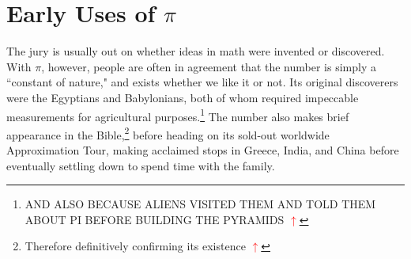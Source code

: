 \documentclass[11pt,titlepage]{article}
\begin{document}
\begin{comment}
\begin{figure}[h]
\centering
\texttt{[image: Jones]}
\caption{William Jones, AKA ``Poofy-White-Haired Donald Trump"}
\end{figure}

\hypertarget{Stuff}The symbol didn't gain widespread usage until it was adopted by Leonhard Euler, who used it in the famous \textit{Introductio in Analysin Infinitorum}\footnote{Latin for ``Math stuff" \hyperlink{Stuff}{\textbf{\textcolor{red}{$\uparrow$}}}} in 1748. From that point on $\pi$ was commonplace notation. 

\begin{figure}[h]
\centering
\texttt{[image: Euler]}
\caption{Leonhard Euler: The Most Prolific Winking Mathematician}
\end{figure}

\hypertarget{prior}Prior to Jones and Euler,\footnote{Jones and Euler: also the title of a low-budget straight-to-VHS buddy cop film \hyperlink{prior}{\textbf{\textcolor{red}{$\uparrow$}}}} notation for $\pi$ was pretty scattered. Some folks used \textit{c} or \textit{p} to mean ``circumference" or ``perimeter," and others just called it ``Archimedes' Constant,"\hypertarget{Archimedes} after the mathematician whose primary claim to fame is enthusiastically hopping out of a bathtub 2200 years ago.\footnote{We'll be hearing much more about Archimedes a bit later on, don't you worry \hyperlink{Stuff}{\textbf{\textcolor{red}{$\uparrow$}}}} 

\end{comment}
\section*{Early Uses of $\pi$}

The jury is usually out on whether ideas in math were invented or discovered. With $\pi$, however, people are often in agreement that the number is simply a ``constant of nature," and exists whether we like it or not. Its original discoverers were the Egyptians and Babylonians, both of whom required impeccable measurements \hypertarget{bible}{}for agricultural purposes\label{agriculture}.\footnote{AND ALSO BECAUSE ALIENS VISITED THEM AND TOLD THEM ABOUT PI BEFORE BUILDING THE PYRAMIDS \hyperref[agriculture]{\textbf{\textcolor{red}{$\uparrow$}}}} The number also makes brief appearance in the Bible,\footnote{Therefore definitively confirming its existence \hyperlink{bible}{\textbf{\textcolor{red}{$\uparrow$}}}} before heading on its sold-out worldwide Approximation Tour, making acclaimed stops in Greece, India, and China before eventually settling down to spend time with the family.
\end{document}
